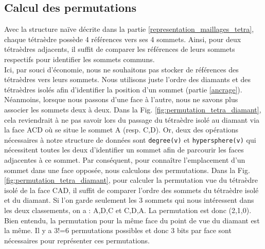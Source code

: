 \subsection{Calcul des permutations}
\noindent
Avec la structure naïve décrite dans la partie \ref{representation_maillages_tetra}, chaque tétraèdre possède 4 références vers ses 4 sommets. Ainsi, pour deux tétraèdres adjacents, il suffit de comparer les références de leurs sommets respectifs pour identifier les sommets communs.\\
Ici, par souci d'économie, nous ne souhaitons pas stocker de références des tétraèdres vers leurs sommets. Nous utilisons juste l'ordre des diamants et des tétraèdres isolés afin d'identifier la position d'un sommet (partie \ref{ancrage}).\\
Néanmoins, lorsque nous passons d'une face à l'autre, nous ne savons plus associer les sommets deux à deux. Dans la Fig. \ref{fig:permutation_tetra_diamant}, cela reviendrait à ne pas savoir lors du passage du tétraèdre isolé au diamant via la face ACD où se situe le sommet A (resp. C,D). Or, deux des opérations nécessaires à notre structure de données sont \texttt{degree(v)} et \texttt{hypersphere(v)} qui nécessitent toutes les deux d'identifier un sommet afin de parcourir les faces adjacentes à ce sommet. Par conséquent, pour connaître l'emplacement d'un sommet dans une face opposée, nous calculons des permutations.
Dans la Fig. \ref{fig:permutation_tetra_diamant}, pour calculer la permutation vue du tétraèdre isolé de la face CAD, il suffit de comparer l'ordre des sommets du tétraèdre isolé et du diamant. Si l'on garde seulement les 3 sommets qui nous intéressent dans les deux classements, on a : A,D,C et C,D,A. La permutation est donc (2,1,0). Bien entendu, la permutation pour la même face du point de vue du diamant est la même. Il y a 3!=6 permutations possibles et donc 3 bits par face sont nécessaires pour représenter ces permutations.

